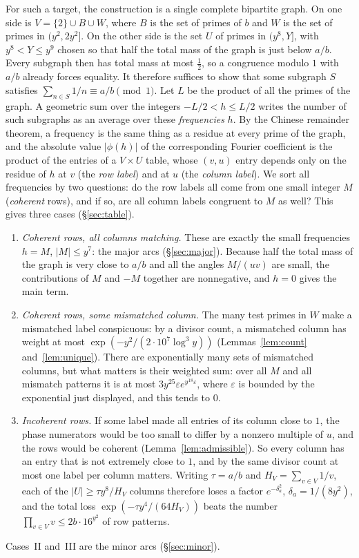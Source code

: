 \documentclass[11pt]{amsart}
\theoremstyle{definition}
\theoremstyle{remark}
\begin{document}
For such a target, the construction is a single complete bipartite graph. On one side is $V=\{2\}\cup B\cup W$, where $B$ is the set of primes of $b$ and $W$ is the set of primes in $(y^2,2y^2]$. On the other side is the set $U$ of primes in $(y^8,Y]$, with $y^8<Y\le y^9$ chosen so that half the total mass of the graph is just below $a/b$. Every subgraph then has total mass at most $\frac12$, so a congruence modulo $1$ with $a/b$ already forces equality. It therefore suffices to show that some subgraph $S$ satisfies $\sum_{n\in S}1/n\equiv a/b\pmod1$. Let $L$ be the product of all the primes of the graph. A geometric sum over the integers $-L/2<h\le L/2$ writes the number of such subgraphs as an average over these \emph{frequencies} $h$. By the Chinese remainder theorem, a frequency is the same thing as a residue at every prime of the graph, and the absolute value $|\phi(h)|$ of the corresponding Fourier coefficient is the product of the entries of a $V\times U$ table, whose $(v,u)$ entry depends only on the residue of $h$ at $v$ (the \emph{row label}) and at $u$ (the \emph{column label}). We sort all frequencies by two questions: do the row labels all come from one small integer $M$ (\emph{coherent} rows), and if so, are all column labels congruent to $M$ as well? This gives three cases (\S\ref{sec:table}).
\begin{enumerate}[label=\Roman*.]
\item \emph{Coherent rows, all columns matching.} These are exactly the small frequencies $h=M$, $|M|\le y^7$: the major arcs (\S\ref{sec:major}). Because half the total mass of the graph is very close to $a/b$ and all the angles $M/(uv)$ are small, the contributions of $M$ and $-M$ together are nonnegative, and $h=0$ gives the main term.
\item \emph{Coherent rows, some mismatched column.} The many test primes in $W$ make a mismatched label conspicuous: by a divisor count, a mismatched column has weight at most $\exp(-y^2/(2\cdot10^7\log^3y))$ (Lemmas~\ref{lem:count} and~\ref{lem:unique}). There are exponentially many sets of mismatched columns, but what matters is their weighted sum: over all $M$ and all mismatch patterns it is at most $3y^{25}\varepsilon e^{y^{18}\varepsilon}$, where $\varepsilon$ is bounded by the exponential just displayed, and this tends to $0$.
\item \emph{Incoherent rows.} If some label made all entries of its column close to $1$, the phase numerators would be too small to differ by a nonzero multiple of $u$, and the rows would be coherent (Lemma~\ref{lem:admissible}). So every column has an entry that is not extremely close to $1$, and by the same divisor count at most one label per column matters. Writing $\tau=a/b$ and $H_V=\sum_{v\in V}1/v$, each of the $|U|\ge\tau y^8/H_V$ columns therefore loses a factor $e^{-\delta_a^2}$, $\delta_a=1/(8y^2)$, and the total loss $\exp(-\tau y^4/(64H_V))$ beats the number $\prod_{v\in V}v\le2b\cdot16^{y^2}$ of row patterns.
\end{enumerate}
Cases~II and~III are the minor arcs (\S\ref{sec:minor}).
\end{document}
